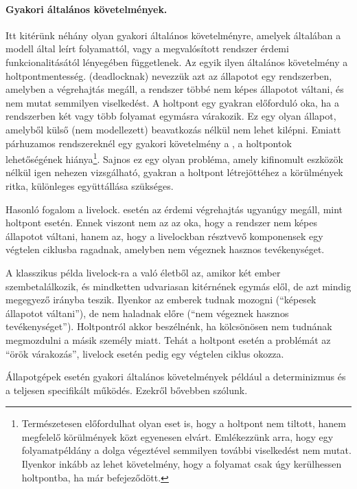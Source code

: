 \paragraph{Gyakori általános követelmények.}
Itt kitérünk néhány olyan gyakori általános követelményre, amelyek általában a modell által leírt folyamattól, vagy a megvalósított rendszer érdemi funkcionalitásától lényegében függetlenek.
Az egyik ilyen általános követelmény a holtpontmentesség.  (deadlocknak) nevezzük azt az állapotot egy rendszerben, amelyben a végrehajtás megáll, a rendszer többé nem képes állapotot váltani, és nem mutat semmilyen viselkedést. A holtpont egy gyakran előforduló oka, ha a rendszerben két vagy több folyamat egymásra várakozik. Ez egy olyan állapot, amelyből külső (nem modellezett) beavatkozás nélkül nem lehet kilépni. Emiatt párhuzamos rendszereknél egy gyakori követelmény a , a holtpontok lehetőségének hiánya\footnote{Természetesen előfordulhat olyan eset is, hogy a holtpont nem tiltott, hanem megfelelő körülmények közt egyenesen elvárt. Emlékezzünk arra, hogy egy folyamatpéldány a dolga végeztével semmilyen további viselkedést nem mutat. Ilyenkor inkább az lehet követelmény, hogy a folyamat csak úgy kerülhessen holtpontba, ha már befejeződött.}. Sajnos ez egy olyan probléma, amely kifinomult eszközök nélkül igen nehezen vizsgálható, gyakran a holtpont létrejöttéhez a körülmények ritka, különleges együttállása szükséges.

Hasonló fogalom a livelock.  esetén az érdemi végrehajtás ugyanúgy megáll, mint holtpont esetén. Ennek viszont nem az az oka, hogy a rendszer nem képes állapotot váltani, hanem az, hogy a livelockban résztvevő komponensek egy végtelen ciklusba ragadnak, amelyben nem végeznek hasznos tevékenységet.

\begin{megjegyzes}
A klasszikus példa livelock-ra a való életből az, amikor két ember szembetalálkozik, és mindketten udvariasan kitérnének egymás elől, de azt mindig megegyező irányba teszik. Ilyenkor az emberek tudnak mozogni (``képesek állapotot váltani''), de nem haladnak előre (``nem végeznek hasznos tevékenységet''). Holtpontról akkor beszélnénk, ha kölcsönösen nem tudnának megmozdulni a másik személy miatt. Tehát a holtpont esetén a problémát az ``örök várakozás'', livelock esetén pedig egy végtelen ciklus okozza.
\end{megjegyzes}

Állapotgépek esetén gyakori általános követelmények például a determinizmus és a teljesen specifikált működés. Ezekről bővebben  szólunk.

